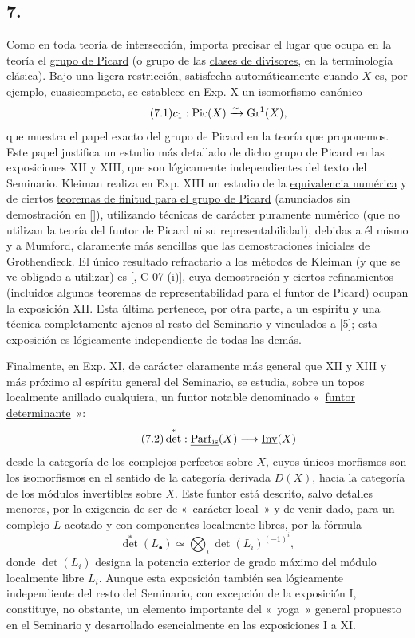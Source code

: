 \subsection*{7.}
Como en toda teoría de intersección, importa precisar el lugar que ocupa en
la teoría el \uline{grupo de Picard} (o grupo de las \uline{clases de
divisores}, en la terminología clásica). Bajo una ligera restricción,
satisfecha automáticamente cuando $X$ es, por ejemplo, cuasicompacto, se
establece en Exp. X un isomorfismo canónico
\begin{equation}\tag{7.1}
c_1:\operatorname{Pic}(X)\xrightarrow{\sim}\operatorname{Gr}^1(X),
\end{equation}
que muestra el papel exacto del grupo de Picard en la teoría que proponemos.
Este papel justifica un estudio más detallado de dicho grupo de Picard en
las exposiciones XII y XIII, que son lógicamente independientes del texto
del Seminario. Kleiman realiza en Exp. XIII un estudio de la
\uline{equivalencia numérica} y de ciertos \uline{teoremas de finitud para el
grupo de Picard} (anunciados sin demostración en []), utilizando técnicas de %
carácter puramente numérico (que no utilizan la teoría del funtor de Picard
ni su representabilidad), debidas a él mismo y a Mumford, claramente más
sencillas que las demostraciones iniciales de Grothendieck. El único
resultado refractario a los métodos de Kleiman (y que se ve obligado a
utilizar) es [, C-07 (i)], cuya demostración y ciertos refinamientos
(incluidos algunos teoremas de representabilidad para el funtor de Picard)
ocupan la exposición XII. Esta última pertenece, por otra parte, a un
espíritu y una técnica completamente ajenos al resto del Seminario y
vinculados a [5]; esta exposición es lógicamente independiente de todas las
demás.

Finalmente, en Exp. XI, de carácter claramente más general que XII y XIII y
más próximo al espíritu general del Seminario, se estudia, sobre un topos
localmente anillado cualquiera, un funtor notable denominado
«~\uline{funtor determinante}~»:
\begin{equation}\tag{7.2}
\det^*:\underline{\operatorname{Parf}_{\mathrm{is}}}(X)\longrightarrow \underline{\operatorname{Inv}}(X)
\end{equation}
desde la categoría de los complejos perfectos sobre $X$, cuyos únicos
morfismos son los isomorfismos en el sentido de la categoría derivada $D(X)$,
hacia la categoría de los módulos invertibles sobre $X$. Este funtor está
descrito, salvo detalles menores, por la exigencia de ser de «~carácter
local~» y de venir dado, para un complejo $L$ acotado y con componentes
localmente libres, por la fórmula
\begin{equation}\tag{7.3}
\det^*(L_\bullet)\simeq\bigotimes_i \det(L_i)^{(-1)^i},
\end{equation}
donde $\det(L_i)$ designa la potencia exterior de grado máximo del módulo
localmente libre $L_i$. Aunque esta exposición también sea lógicamente
independiente del resto del Seminario, con excepción de la exposición I,
constituye, no obstante, un elemento importante del «~yoga~» general
propuesto en el Seminario y desarrollado esencialmente en las exposiciones I
a XI.

